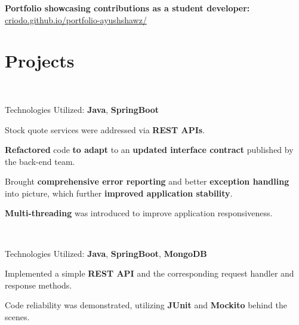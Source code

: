 \documentclass[]{deedy-resume-openfont}
\begin{document}
\begin{minipage}[t]{0.66\textwidth}
\setlength\parindent{24pt} \textbf{Portfolio showcasing contributions as a student developer:} \\ 
\href{https://criodo.github.io/portfolio-ayushshawz/}{criodo.github.io/portfolio-ayushshawz/}\\
\setlength\parindent{0pt}


\section{Projects}

\\
\begin{tightemize}
\item Technologies Utilized: \textbf{Java}, \textbf{SpringBoot}
\item Stock quote services were addressed via \textbf{REST APIs}.
\item \textbf{Refactored} code \textbf{to adapt} to an \textbf{updated interface contract} published by the back-end team.
\item Brought \textbf{comprehensive error reporting} and better \textbf{exception handling} into picture, which further \textbf{improved application stability}.
\item \textbf{Multi-threading} was introduced to improve application responsiveness.
\end{tightemize}
\sectionsep

\\
\begin{tightemize}
\item Technologies Utilized: \textbf{Java}, \textbf{SpringBoot}, \textbf{MongoDB}
\item Implemented a simple \textbf{REST API} and the corresponding request handler and response methods.
\item Code reliability was demonstrated, utilizing \textbf{JUnit} and \textbf{Mockito} behind the scenes.
\end{tightemize}
\sectionsep


\end{minipage}
\end{document}
